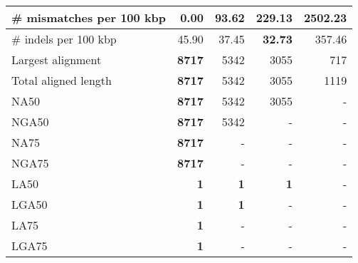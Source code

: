 \documentclass[12pt,a4paper]{article}
\begin{document}
\begin{table}[ht]
\begin{center}
\begin{tabular}{|l*{4}{|r}|}
\# mismatches per 100 kbp & {\bf 0.00} & 93.62 & 229.13 & 2502.23 \\ \hline
\# indels per 100 kbp & 45.90 & 37.45 & {\bf 32.73} & 357.46 \\ \hline
Largest alignment & {\bf 8717} & 5342 & 3055 & 717 \\ \hline
Total aligned length & {\bf 8717} & 5342 & 3055 & 1119 \\ \hline
NA50 & {\bf 8717} & 5342 & 3055 & - \\ \hline
NGA50 & {\bf 8717} & 5342 & - & - \\ \hline
NA75 & {\bf 8717} & - & - & - \\ \hline
NGA75 & {\bf 8717} & - & - & - \\ \hline
LA50 & {\bf 1} & {\bf 1} & {\bf 1} & - \\ \hline
LGA50 & {\bf 1} & {\bf 1} & - & - \\ \hline
LA75 & {\bf 1} & - & - & - \\ \hline
LGA75 & {\bf 1} & - & - & - \\ \hline
\end{tabular}
\end{center}
\end{table}
\end{document}
